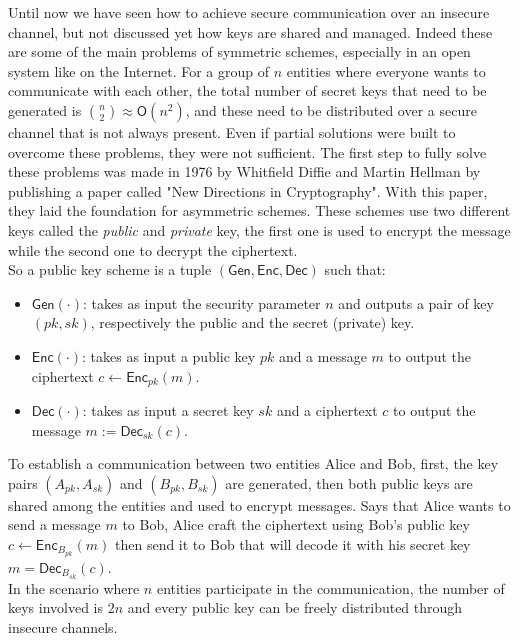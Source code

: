 Until now we have seen how to achieve secure communication  over an insecure channel, but not discussed yet how keys are shared and managed. Indeed these are some of the main problems of symmetric schemes, especially in an open system like on the Internet. For a group of $n$ entities where everyone wants to communicate with each other, the total number of secret keys that need to be generated is $\binom{n}{2} \approx \mathsf{O}(n^2)$, and these need to be distributed over a secure channel that is not always present.
Even if partial solutions were built to overcome these problems, they were not sufficient.
The first step to fully solve these problems was made in 1976 by Whitfield Diffie and Martin Hellman by publishing a paper called "New Directions in Cryptography". With this paper, they laid the foundation for asymmetric schemes. These schemes use two different keys called the \emph{public} and \emph{private} key, the first one is used to encrypt the message while the second one to decrypt the ciphertext.\\
So a public key scheme is a tuple $(\mathsf{Gen}, \mathsf{Enc}, \mathsf{Dec})$ such that:
\begin{itemize}
    \item{$\mathsf{Gen}(\cdot)$: takes as input the security parameter $n$ and outputs a pair of key $(pk, sk)$, respectively the public and the secret (private) key.}
    \item{$\mathsf{Enc}(\cdot)$: takes as input a public key $pk$ and a message $m$ to output the ciphertext $c \leftarrow \mathsf{Enc}_{pk}(m)$.}
    \item{$\mathsf{Dec}(\cdot)$: takes as input a secret key $sk$ and a ciphertext $c$ to output the message $m := \mathsf{Dec}_{sk}(c)$.}
\end{itemize}
To establish a communication between two entities Alice and Bob, first, the key pairs $(A_{pk}, A_{sk})$ and $(B_{pk}, B_{sk})$ are generated, then both public keys are shared among the entities and used to encrypt messages. Says that Alice wants to send a message $m$ to Bob, Alice craft the ciphertext using Bob's public key $c \leftarrow  \mathsf{Enc}_{B_{pk}}(m)$ then send it to Bob that will decode it with his secret key $m = \mathsf{Dec}_{B_{sk}}(c)$.\\
In the scenario where $n$ entities participate in the communication, the number of keys involved is $2n$ and every public key can be freely distributed through insecure channels.

